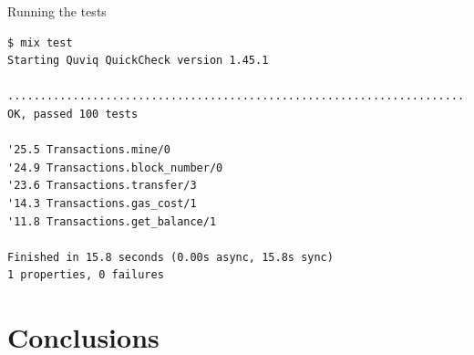 \documentclass[aspectratio=169, 10pt]{beamer}
\begin{document}
\begin{frame}[label={sec:orga2083bb},fragile]{Running the tests}
 \lstset{language=bash,label= ,caption= ,captionpos=b,numbers=none,style=shell}
\begin{lstlisting}
$ mix test
Starting Quviq QuickCheck version 1.45.1

....................................................................................................
OK, passed 100 tests

'25.5 Transactions.mine/0
'24.9 Transactions.block_number/0
'23.6 Transactions.transfer/3
'14.3 Transactions.gas_cost/1
'11.8 Transactions.get_balance/1

Finished in 15.8 seconds (0.00s async, 15.8s sync)
1 properties, 0 failures
\end{lstlisting}
\end{frame}


\section{Conclusions}
\label{sec:org40d8a05}
\end{document}
